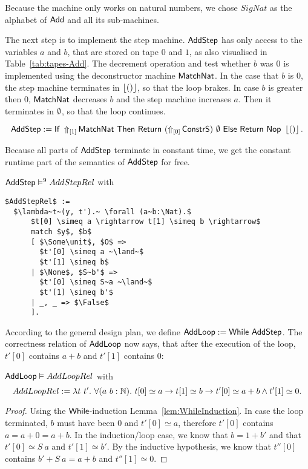 Because the machine only works on natural numbers, we chose $SigNat$ as the alphabet of $\MS{Add}$ and all its sub-machines.

The next step is to implement the step machine.  $\MS{AddStep}$ has only access to the variables $a$ and $b$, that are stored on tape $0$ and $1$, as
also visualised in Table~\ref{tab:tapes-Add}.  The decrement operation and test whether $b$ was $0$ is implemented using the deconstructor machine
$\MS{MatchNat}$.  In the case that $b$ is $0$, the step machine terminates in $\Some\unit$, so that the loop brakes.  In case $b$ is greater then $0$,
$\MS{MatchNat}$ decreases $b$ and the step machine increases $a$.  Then it terminates in $\None$, so that the loop continues.
\begin{definition}[$\MS{AddStep}$]
  \label{def:Add_Step}
  \[
    \MS{AddStep} := \If{\LiftTapes{\MS{MatchNat}}{\Vector{1}}}{\Return{(\LiftTapes{\MS{ConstrS}}{\Vector{0}})}{\None}}{\Return{\Nop}{\Some\unit}}.
  \]
\end{definition}

Because all parts of $\MS{AddStep}$ terminate in constant time, we get the constant runtime part of the semantics of $\MS{AddStep}$ for free.
\begin{lemma}
  \label{lem:Add_Step_Sem}
  $\MS{AddStep} \RealiseIn{9} AddStepRel$ with
\begin{lstlisting}[style=semicoqstyle]
$AddStepRel$ :=
  $\lambda~t~(y, t').~ \forall (a~b:\Nat).$
      $t[0] \simeq a \rightarrow t[1] \simeq b \rightarrow$
      match $y$, $b$
      [ $\Some\unit$, $O$ =>
        $t'[0] \simeq a ~\land~$
        $t'[1] \simeq b$
      | $\None$, $S~b'$ =>
        $t'[0] \simeq S~a ~\land~$
        $t'[1] \simeq b'$
      | _, _ => $\False$
      ].
\end{lstlisting}
\end{lemma}

According to the general design plan, we define $\MS{AddLoop} := \While~\MS{AddStep}$.  The correctness relation of $\MS{AddLoop}$ now says, that
after the execution of the loop, $t'[0]$ contains $a+b$ and $t'[1]$ contains $0$:
\begin{lemma}
  \label{lem:Add_Loop_Sem}
  $\MS{AddLoop} \Realise AddLoopRel$ with
  \[
    AddLoopRel := \lambda t~t'.~\forall (a~b:\Nat).~t[0] \simeq a \rightarrow t[1] \simeq b \rightarrow t'[0] \simeq a+b \land t'[1] \simeq 0.
  \]
\end{lemma}
\begin{proof}
  Using the $\While$-induction Lemma~\ref{lem:WhileInduction}.  In case the loop terminated, $b$ must have been $0$ and $t'[0] \simeq a$, therefore
  $t'[0]$ contains $a=a+0=a+b$.  In the induction/loop case, we know that $b=1+b'$ and that $t'[0] \simeq S~a$ and $t'[1] \simeq b'$.  By the
  inductive hypothesis, we know that $t''[0]$ contains $b' + S~a = a+b$ and $t''[1] \simeq 0$.
\end{proof}

